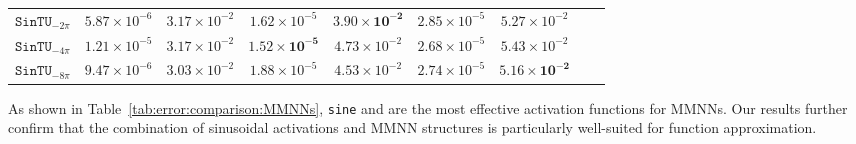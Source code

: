 \documentclass[11pt,a4paper]{article}
\begin{document}
\begin{table}[ht]
{\begin{tabular}{ccccccccc}
 $\mathtt{SinTU}_{-2\pi}$ &  $ 5.87 \times 10^{-6} $  &  $ 3.17 \times 10^{-2} $  &  $ 1.62 \times 10^{-5} $  &  $ \bm{3.90 \times 10^{-2}} $  &  $ 2.85 \times 10^{-5} $  &  $ 5.27 \times 10^{-2} $ 
 \\ 

\rowcolor{mygray}$\mathtt{SinTU}_{-4\pi}$ &  $ 1.21 \times 10^{-5} $  &  $ 3.17 \times 10^{-2} $  &  $ \bm{ 1.52 \times 10^{-5}} $  &  $ 4.73 \times 10^{-2} $  &  $ 2.68 \times 10^{-5} $  &  $ 5.43 \times 10^{-2} $ 
 \\ 

 $\mathtt{SinTU}_{-8\pi}$ &  $ 9.47 \times 10^{-6} $  &  $ 3.03 \times 10^{-2} $  &  $ 1.88 \times 10^{-5} $  &  $ 4.53 \times 10^{-2} $  &  $ 2.74 \times 10^{-5} $  &  $ \bm{5.16 \times 10^{-2}} $ 
 \\ 



 \bottomrule%
		\end{tabular} 
	}%
\end{table} 


As shown in Table~\ref{tab:error:comparison:MMNNs}, \texttt{sine} and  are the most effective activation functions for MMNNs. Our results further confirm that the combination of sinusoidal activations and MMNN structures is particularly well-suited for function approximation.  
\end{document}
